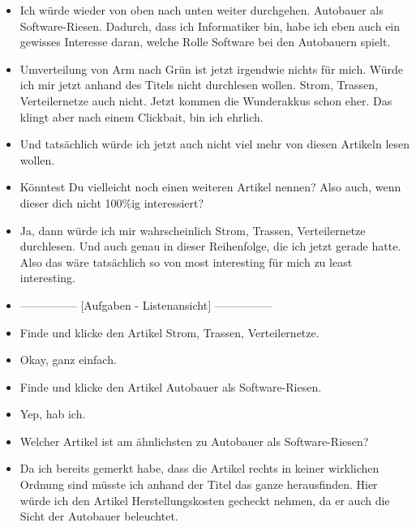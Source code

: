 {\begin{itemize}[]
              Also \flqq Fürs Klima und gegen China\frqq{} würde ich mir durchlesen, weil ich das gut finde, wenn wir halt vielleicht nicht so abhängig sind von anderen Staaten, was E-Mobilität angeht.
        \item {} Ich würde wieder von oben nach unten weiter durchgehen.
              \flqq Autobauer als Software-Riesen\frqq{}.
              Dadurch, dass ich Informatiker bin, habe ich eben auch ein gewisses Interesse daran, welche Rolle Software bei den Autobauern spielt.
        \item {} \flqq Umverteilung von Arm nach Grün\frqq{} ist jetzt irgendwie nichts für mich. Würde ich mir jetzt anhand des Titels nicht durchlesen wollen.
              \flqq Strom, Trassen, Verteilernetze\frqq{} auch nicht.
              \flqq Jetzt kommen die Wunderakkus\frqq{} schon eher.
              Das klingt aber nach einem Clickbait, bin ich ehrlich.
        \item {} Und tatsächlich würde ich jetzt auch nicht viel mehr von diesen Artikeln lesen wollen.
        \item {} Könntest Du vielleicht noch einen weiteren Artikel nennen? Also auch, wenn dieser dich nicht 100\%ig interessiert?
        \item {} Ja, dann würde ich mir wahrscheinlich \flqq Strom, Trassen, Verteilernetze\frqq{} durchlesen.
              Und auch genau in dieser Reihenfolge, die ich jetzt gerade hatte.
              Also das wäre tatsächlich so von most interesting für mich zu least interesting.
        \item {---------------} [Aufgaben - Listenansicht] {---------------}
        \item {} Finde und klicke den Artikel \flqq Strom, Trassen, Verteilernetze\frqq{}.
        \item {} Okay, ganz einfach.
        \item {} Finde und klicke den Artikel \flqq Autobauer als Software-Riesen\frqq{}.
        \item {} Yep, hab ich.
        \item {} Welcher Artikel ist am ähnlichsten zu \flqq Autobauer als Software-Riesen\frqq{}?
        \item {} Da ich bereits gemerkt habe, dass die Artikel rechts in keiner wirklichen Ordnung sind müsste ich anhand der Titel das ganze herausfinden.
        Hier würde ich den Artikel \flqq Herstellungskosten gecheckt\frqq{} nehmen, da er auch die Sicht der Autobauer beleuchtet.

\end{itemize}}
